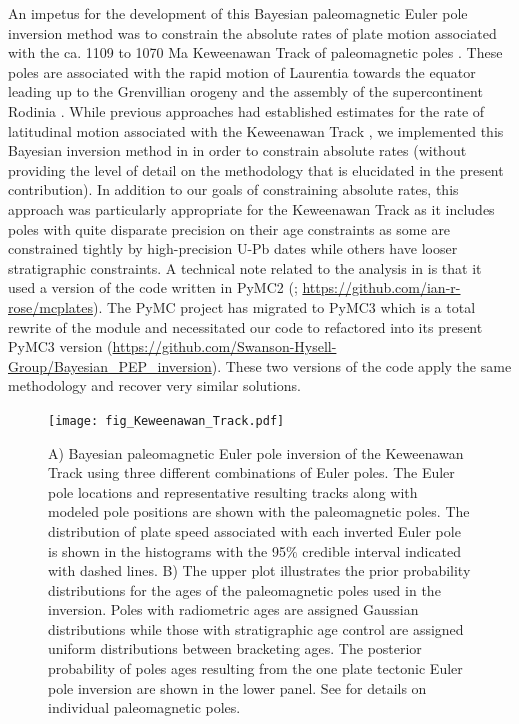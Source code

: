 \documentclass[11pt,letterpaper]{article}
\begin{document}
An impetus for the development of this Bayesian paleomagnetic Euler pole inversion method was to constrain the absolute rates of plate motion associated with the ca. 1109 to 1070 Ma Keweenawan Track of paleomagnetic poles \citep{Halls1981a, Swanson-Hysell2009a, Swanson-Hysell2019a}. These poles are associated with the rapid motion of Laurentia towards the equator leading up to the Grenvillian orogeny and the assembly of the supercontinent Rodinia \citep{Swanson-Hysell2021a}. While previous approaches had established estimates for the rate of latitudinal motion associated with the Keweenawan Track \citep{Davis1997a, Swanson-Hysell2014b}, we implemented this Bayesian inversion method in \cite{Swanson-Hysell2019a} in order to constrain absolute rates (without providing the level of detail on the methodology that is elucidated in the present contribution). In addition to our goals of constraining absolute rates, this approach was particularly appropriate for the Keweenawan Track as it includes poles with quite disparate precision on their age constraints as some are constrained tightly by high-precision U-Pb dates \citep[e.g.][]{Fairchild2017a} while others have looser stratigraphic constraints. A technical note related to the analysis in \cite{Swanson-Hysell2019a} is that it used a version of the code written in PyMC2 (\citealp{Patil2010a}; \url{https://github.com/ian-r-rose/mcplates}). The PyMC project has migrated to PyMC3 which is a total rewrite of the module \citep{Salvatier2016a} and necessitated our code to refactored into its present PyMC3 version (\url{https://github.com/Swanson-Hysell-Group/Bayesian_PEP_inversion}). These two versions of the code apply the same methodology and recover very similar solutions.

\begin{figure}
\centering
\texttt{[image: fig\_Keweenawan\_Track.pdf]}
\caption{A) Bayesian paleomagnetic Euler pole inversion of the Keweenawan Track using three different combinations of Euler poles. The Euler pole locations and representative resulting tracks along with modeled pole positions are shown with the paleomagnetic poles. The distribution of plate speed associated with each inverted Euler pole is shown in the histograms with the 95$\%$ credible interval indicated with dashed lines. B) The upper plot illustrates the prior probability distributions for the ages of the paleomagnetic poles used in the inversion. Poles with radiometric ages are assigned Gaussian distributions while those with stratigraphic age control are assigned uniform distributions between bracketing ages. The posterior probability of poles ages resulting from the one plate tectonic Euler pole inversion are shown in the lower panel. See \cite{Swanson-Hysell2019a} for details on individual paleomagnetic poles.}
\label{fig:Keweenawan_Track}
\end{figure}
\end{document}
